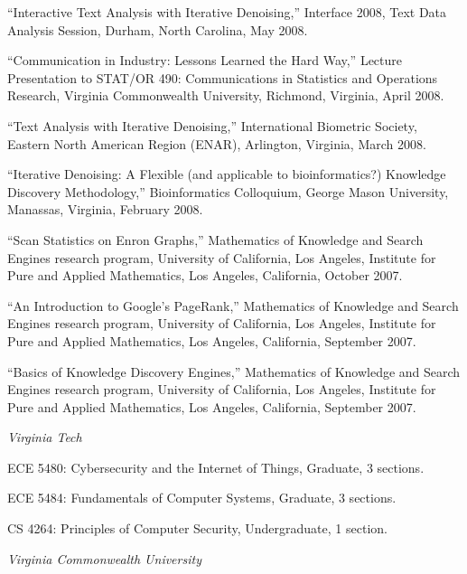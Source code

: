 \documentclass[11pt,article,oneside]{memoir}
\begin{document}
\ind “Interactive Text Analysis with Iterative Denoising,” Interface 2008, Text Data Analysis Session, Durham, North Carolina, May 2008.

\ind “Communication in Industry: Lessons Learned the Hard Way,” Lecture Presentation to STAT/OR 490: Communications in Statistics and Operations Research, Virginia Commonwealth University, Richmond, Virginia, April 2008.

\ind “Text Analysis with Iterative Denoising,” International Biometric Society, Eastern North American Region (ENAR), Arlington, Virginia, March 2008.

\ind “Iterative Denoising: A Flexible (and applicable to bioinformatics?) Knowledge Discovery Methodology,” Bioinformatics Colloquium, George Mason University, Manassas, Virginia, February 2008.

\ind “Scan Statistics on Enron Graphs,” Mathematics of Knowledge and Search Engines research program, University of California, Los Angeles, Institute for Pure and Applied Mathematics, Los Angeles, California, October 2007.

\ind “An Introduction to Google’s PageRank,” Mathematics of Knowledge and Search Engines research program, University of California, Los Angeles, Institute for Pure and Applied Mathematics, Los Angeles, California, September 2007.

\ind “Basics of Knowledge Discovery Engines,” Mathematics of Knowledge and Search Engines research program, University of California, Los Angeles, Institute for Pure and Applied Mathematics, Los Angeles, California, September 2007.


 


\bigskip


\noindent\emph{Virginia Tech \vspace{0.05in}}

\ind ECE 5480: Cybersecurity and the Internet of Things, Graduate, 3 sections.

\ind ECE 5484: Fundamentals of Computer Systems, Graduate, 3 sections.

\ind CS 4264: Principles of Computer Security, Undergraduate, 1 section.

\bigskip

\noindent\emph{Virginia Commonwealth University \vspace{0.05in}}
\end{document}
